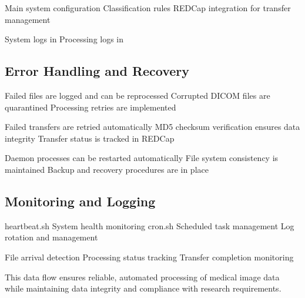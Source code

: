 \documentclass[letterpaper,10pt,english]{sphinxmanual}
\begin{document}
\sphinxAtStartPar
{}
\sphinxhyphen{}  \sphinxhyphen{} Main system configuration
\sphinxhyphen{}  \sphinxhyphen{} Classification rules
\sphinxhyphen{} REDCap integration for transfer management

\sphinxAtStartPar
{}
\sphinxhyphen{} System logs in 
\sphinxhyphen{} Processing logs in 


\subsection{Error Handling and Recovery}
\label{\detokenize{Architecture/data-flow:error-handling-and-recovery}}
\sphinxAtStartPar
{}
\sphinxhyphen{} Failed files are logged and can be reprocessed
\sphinxhyphen{} Corrupted DICOM files are quarantined
\sphinxhyphen{} Processing retries are implemented

\sphinxAtStartPar
{}
\sphinxhyphen{} Failed transfers are retried automatically
\sphinxhyphen{} MD5 checksum verification ensures data integrity
\sphinxhyphen{} Transfer status is tracked in REDCap

\sphinxAtStartPar
{}
\sphinxhyphen{} Daemon processes can be restarted automatically
\sphinxhyphen{} File system consistency is maintained
\sphinxhyphen{} Backup and recovery procedures are in place


\subsection{Monitoring and Logging}
\label{\detokenize{Architecture/data-flow:monitoring-and-logging}}
\sphinxAtStartPar
{}
\sphinxhyphen{} heartbeat.sh \sphinxhyphen{} System health monitoring
\sphinxhyphen{} cron.sh \sphinxhyphen{} Scheduled task management
\sphinxhyphen{} Log rotation and management

\sphinxAtStartPar
{}
\sphinxhyphen{} File arrival detection
\sphinxhyphen{} Processing status tracking
\sphinxhyphen{} Transfer completion monitoring

\sphinxAtStartPar
This data flow ensures reliable, automated processing of medical image data while maintaining data integrity and compliance with research requirements.
\end{document}
